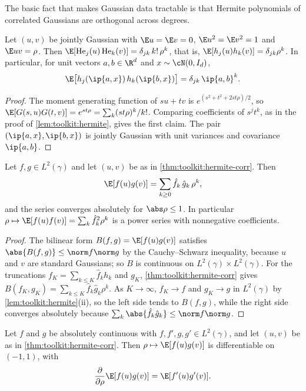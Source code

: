 \begin{refsection}
The basic fact that makes Gaussian data tractable is that Hermite polynomials of correlated Gaussians are orthogonal across degrees.

\begin{theorem}\label{thm:toolkit:hermite-corr}
Let $(u,v)$ be jointly Gaussian with $\E u=\E v=0$, $\E u^2=\E v^2=1$ and $\E uv=\rho$. Then $\E[\He_j(u)\He_k(v)]=\delta_{jk}\,k!\,\rho^k$, that is, $\E[h_j(u)h_k(v)]=\delta_{jk}\rho^k$. In particular, for unit vectors $a,b\in\R^d$ and $x\sim\cN(0,I_d)$,
\[
  \E\big[h_j(\ip{a,x})\,h_k(\ip{b,x})\big]=\delta_{jk}\,\ip{a,b}^k.
\]
\end{theorem}

\begin{proof}
The moment generating function of $su+tv$ is $e^{(s^2+t^2+2st\rho)/2}$, so $\E[G(s,u)G(t,v)]=e^{st\rho}=\sum_k(st\rho)^k/k!$. Comparing coefficients of $s^jt^k$, as in the proof of \cref{lem:toolkit:hermite}, gives the first claim. The pair $(\ip{a,x},\ip{b,x})$ is jointly Gaussian with unit variances and covariance $\ip{a,b}$.
\end{proof}

\begin{corollary}\label{cor:toolkit:dual}
Let $f,g\in L^2(\gamma)$ and let $(u,v)$ be as in \cref{thm:toolkit:hermite-corr}. Then
\[
  \E[f(u)g(v)]=\sum_{k\ge0}\hat f_k\,\hat g_k\,\rho^k,
\]
and the series converges absolutely for $\abs\rho\le1$. In particular $\rho\mapsto\E[f(u)f(v)]=\sum_k\hat f_k^2\rho^k$ is a power series with nonnegative coefficients.
\end{corollary}

\begin{proof}
The bilinear form $B(f,g)=\E[f(u)g(v)]$ satisfies $\abs{B(f,g)}\le\norm f\norm g$ by the Cauchy--Schwarz inequality, because $u$ and $v$ are standard Gaussians; so $B$ is continuous on $L^2(\gamma)\times L^2(\gamma)$. For the truncations $f_K=\sum_{k\le K}\hat f_kh_k$ and $g_K$, \cref{thm:toolkit:hermite-corr} gives $B(f_K,g_K)=\sum_{k\le K}\hat f_k\hat g_k\rho^k$. As $K\to\infty$, $f_K\to f$ and $g_K\to g$ in $L^2(\gamma)$ by \cref{lem:toolkit:hermite}(ii), so the left side tends to $B(f,g)$, while the right side converges absolutely because $\sum_k\abs{\hat f_k\hat g_k}\le\norm f\norm g$.
\end{proof}

\begin{lemma}\label{lem:toolkit:price}
Let $f$ and $g$ be absolutely continuous with $f,f',g,g'\in L^2(\gamma)$, and let $(u,v)$ be as in \cref{thm:toolkit:hermite-corr}. Then $\rho\mapsto\E[f(u)g(v)]$ is differentiable on $(-1,1)$, with
\[
  \frac{\partial}{\partial\rho}\E[f(u)g(v)]=\E[f'(u)g'(v)].
\]
\end{lemma}


\end{refsection}
